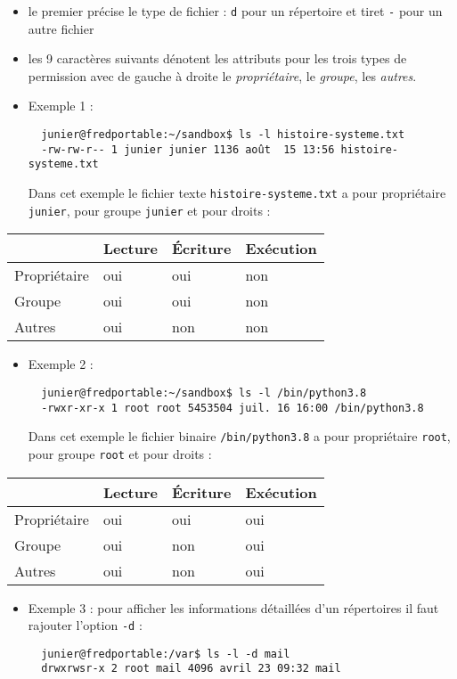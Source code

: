 \documentclass[
  11pt,
]{article}
\newcounter{prop}
\newcounter{histo}
\begin{document}
\begin{itemize}
\item
  le premier précise le type de fichier : \texttt{d} pour un répertoire
  et tiret \texttt{-} pour un autre fichier
\item
  les 9 caractères suivants dénotent les attributs pour les trois types
  de permission avec de gauche à droite le \emph{propriétaire}, le
  \emph{groupe}, les \emph{autres}.
\item
  Exemple 1 :

\begin{verbatim}
  junier@fredportable:~/sandbox$ ls -l histoire-systeme.txt         
  -rw-rw-r-- 1 junier junier 1136 août  15 13:56 histoire-systeme.txt
\end{verbatim}

  Dans cet exemple le fichier texte \texttt{histoire-systeme.txt} a pour
  propriétaire \texttt{junier}, pour groupe \texttt{junier} et pour
  droits :
\end{itemize}

\begin{longtable}[]{@{}llll@{}}
\toprule
& Lecture & Écriture & Exécution\tabularnewline
\midrule
\endhead
Propriétaire & oui & oui & non\tabularnewline
Groupe & oui & oui & non\tabularnewline
Autres & oui & non & non\tabularnewline
\bottomrule
\end{longtable}

\begin{itemize}
\item
  Exemple 2 :

\begin{verbatim}
  junier@fredportable:~/sandbox$ ls -l /bin/python3.8
  -rwxr-xr-x 1 root root 5453504 juil. 16 16:00 /bin/python3.8
\end{verbatim}

  Dans cet exemple le fichier binaire \texttt{/bin/python3.8} a pour
  propriétaire \texttt{root}, pour groupe \texttt{root} et pour droits :
\end{itemize}

\begin{longtable}[]{@{}llll@{}}
\toprule
& Lecture & Écriture & Exécution\tabularnewline
\midrule
\endhead
Propriétaire & oui & oui & oui\tabularnewline
Groupe & oui & non & oui\tabularnewline
Autres & oui & non & oui\tabularnewline
\bottomrule
\end{longtable}

\begin{itemize}
\item
  Exemple 3 : pour afficher les informations détaillées d'un répertoires
  il faut rajouter l'option \texttt{-d} :

\begin{verbatim}
  junier@fredportable:/var$ ls -l -d mail
  drwxrwsr-x 2 root mail 4096 avril 23 09:32 mail
\end{verbatim}
\end{itemize}
\end{document}
